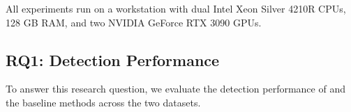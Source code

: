 All experiments run on a workstation with dual Intel Xeon Silver 4210R CPUs, 128 GB RAM, and two NVIDIA GeForce RTX 3090 GPUs.

\subsection{RQ1: Detection Performance}



\label{sec:rq1}


To answer this research question, we evaluate the detection performance of \toolname{} and the baseline methods across the two datasets. 

